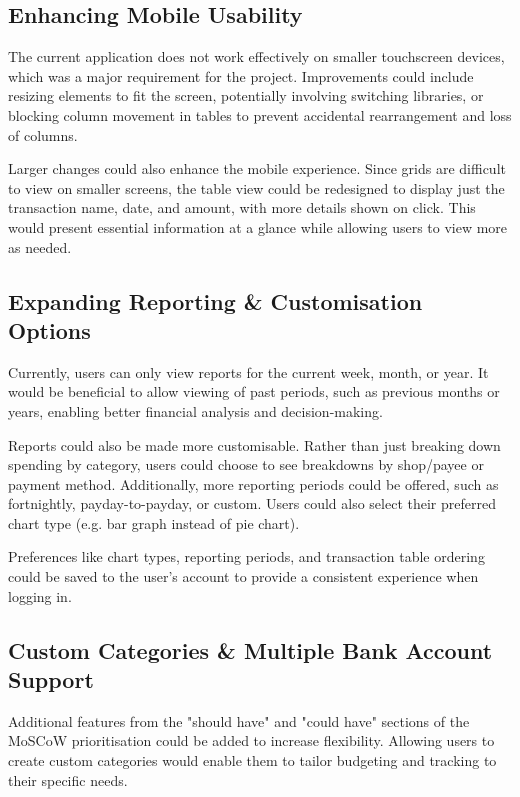 \documentclass{l4proj}
\begin{document}
\subsection{Enhancing Mobile Usability}

The current application does not work effectively on smaller touchscreen devices, which was a major requirement for the project. Improvements could include resizing elements to fit the screen, potentially involving switching libraries, or blocking column movement in tables to prevent accidental rearrangement and loss of columns.

Larger changes could also enhance the mobile experience. Since grids are difficult to view on smaller screens, the table view could be redesigned to display just the transaction name, date, and amount, with more details shown on click. This would present essential information at a glance while allowing users to view more as needed.

\subsection{Expanding Reporting \& Customisation Options}

Currently, users can only view reports for the current week, month, or year. It would be beneficial to allow viewing of past periods, such as previous months or years, enabling better financial analysis and decision-making.

Reports could also be made more customisable. Rather than just breaking down spending by category, users could choose to see breakdowns by shop/payee or payment method. Additionally, more reporting periods could be offered, such as fortnightly, payday-to-payday, or custom. Users could also select their preferred chart type (e.g. bar graph instead of pie chart).

Preferences like chart types, reporting periods, and transaction table ordering could be saved to the user’s account to provide a consistent experience when logging in.

\subsection{Custom Categories \& Multiple Bank Account Support}

Additional features from the "should have" and "could have" sections of the MoSCoW prioritisation could be added to increase flexibility. Allowing users to create custom categories would enable them to tailor budgeting and tracking to their specific needs.
\end{document}
